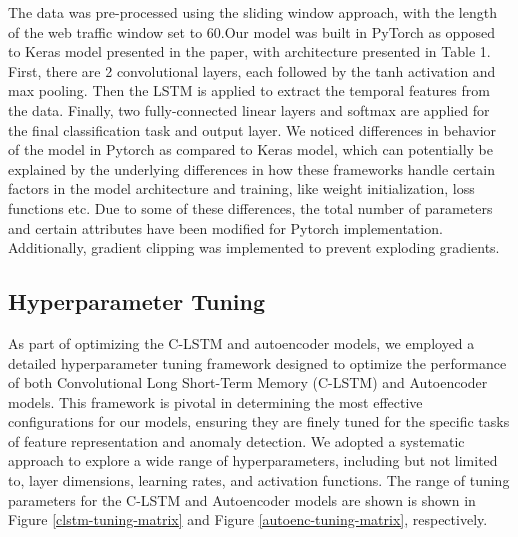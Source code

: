 \documentclass[10pt,twocolumn,letterpaper]{article}
\begin{document}
The data was pre-processed using the sliding window approach, with the length of the web traffic window set to 60.Our model was built in PyTorch as opposed to Keras model presented in the paper, 
with architecture presented in Table 1. First, there are 2 convolutional layers, each followed by the tanh activation and max pooling. Then the LSTM is applied to extract the temporal features from the data. 
Finally, two fully-connected linear layers and softmax are applied for the final classification task and output layer. We noticed differences in behavior of the model in Pytorch as compared to Keras model, 
which can potentially be explained by the underlying differences in how these frameworks handle certain factors in the model architecture and training, like weight initialization, loss functions etc. 
Due to some of these differences, the total number of parameters and certain attributes have been modified for Pytorch implementation. Additionally, gradient clipping was implemented to prevent exploding 
gradients. 

\subsection{Hyperparameter Tuning}
As part of optimizing the C-LSTM and autoencoder models, we employed a detailed hyperparameter tuning framework designed to optimize the performance of both Convolutional Long Short-Term Memory (C-LSTM) 
and Autoencoder models. This framework is pivotal in determining the most effective configurations for our models, ensuring they are finely tuned for the specific tasks of feature 
representation and anomaly detection. We adopted a systematic approach to explore a wide range of hyperparameters, including but not limited to, layer dimensions, learning rates, and activation functions. 
The range of tuning parameters for the C-LSTM and Autoencoder models are shown is shown in Figure \ref*{clstm-tuning-matrix} and Figure \ref*{autoenc-tuning-matrix}, respectively.
\end{document}
